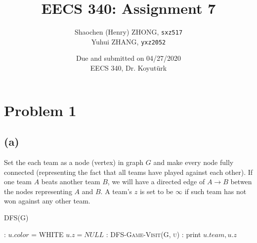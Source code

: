 \documentclass[11pt]{article}
\newcommand{\ilc}{\texttt}
\begin{document}
\title{\textbf{EECS 340: Assignment 7}}

\author{Shaochen (Henry) ZHONG, \ilc{sxz517} \\ Yuhui ZHANG, \ilc{yxz2052}}
\date{Due and submitted on 04/27/2020 \\ EECS 340, Dr. Koyut{\"u}rk}
\maketitle

\section{Problem 1}

\subsection{(a)}

Set the each team as a node (vertex) in graph $G$ and make every node fully connected (representing the fact that all teams have played against each other). If one team $A$ beats another team $B$, we will have a directed edge of $A \rightarrow B$ betwen the nodes representing $A$ and $B$. A team's $z$ is set to be $\infty$ if such team has not won against any other team.

\begin{algorithm}[H]
\caption{DFS(G)}
    \begin{algorithmic}[1]
        :
            \State $u.color$ = WHITE
            \State $u.z = NULL$
        \EndFor
        :
                \State \textsc{DFS-Game-Visit(G, u)}
            \EndIf
        \EndFor
        :
            \State print $u.team, u.z$
        \EndFor
    \end{algorithmic}
\end{algorithm}
\end{document}
